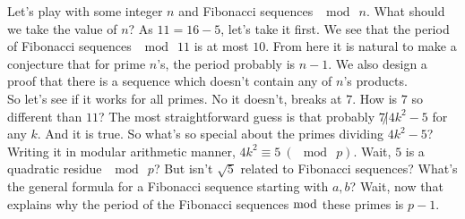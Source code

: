Let's play with some integer $ n $ and Fibonacci sequences $ \mod\ n $. What should we take the value of $ n $? As $ 11=16-5 $, let's take it first. We see that the period of Fibonacci sequences $ \mod\ 11 $ is at most $ 10 $. From here it is natural to make a conjecture that for prime $ n $'s, the period probably is $ n-1 $. We also design a proof that there is a sequence which doesn't contain any of $ n $'s products. \\

So let's see if it works for all primes. No it doesn't, breaks at $ 7 $. How is $ 7 $ so different than $ 11 $? The most straightforward guess is that probably $ 7\not| 4k^2-5 $ for any $ k $. And it is true. So what's so special about the primes dividing $ 4k^2-5 $?
Writing it in modular arithmetic manner, $ 4k^2\equiv 5\ (\mod\ p) $. Wait, $ 5 $ is a quadratic residue $ \mod\ p $? But isn't $ \sqrt{5} $ related to Fibonacci sequences? What's the general formula for a Fibonacci sequence starting with $ a, b $? Wait, now that explains why the period of the Fibonacci sequences $ \mod $ these primes is $ p-1 $.